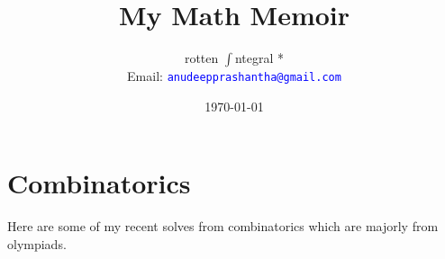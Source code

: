 \documentclass[a4paper, 11pt]{book}
\title{\textbf{My Math Memoir}}
\author{rotten $\int$ntegral *\\Email: \textcolor{blue}{\texttt{anudeepprashantha@gmail.com}}}
\date{\today}
\begin{document}
\maketitle
    \tableofcontents

	\chapter{Combinatorics}
	\noindent Here are some of my recent solves from combinatorics which are majorly from olympiads. 
	
	
	
	
\end{document}
